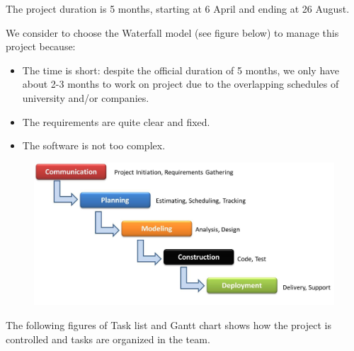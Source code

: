 \documentclass[11pt]{article}
\begin{document}
\par\noindent The project duration is 5 months, starting at 6 April and ending at 26 August.
\par\noindent We consider to choose the Waterfall model (see figure below) to manage this project because: 
\begin{itemize}
\item The time is short: despite the official duration of 5 months, we only have about 2-3 months to work on project due to the overlapping schedules of university and/or companies.
\item The requirements are quite clear and fixed.
\item The software is not too complex.
\end{itemize}
\begin{figure}[H] 
  \includegraphics[width=\linewidth]{P3.jpg}
  \label{fig:wmodel}
\end{figure}
\par\noindent The following figures of Task list and Gantt chart shows how the project is controlled and tasks are organized in the team.
\begin{figure}[H] 
  \label{fig:gantt1}
\end{figure}
\end{document}
